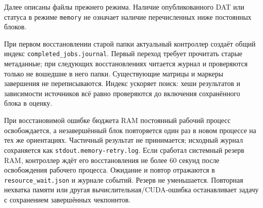 Далее описаны файлы прежнего режима. Наличие опубликованного DAT или
статуса в режиме \texttt{memory} не означает наличие перечисленных ниже
постоянных блоков.

При первом восстановлении старой папки актуальный контроллер создаёт
общий индекс \nolinkurl{completed_jobs.journal}. Первый переход требует
прочитать старые метаданные; при следующих восстановлениях читается
журнал и проверяются только не вошедшие в него папки. Существующие
матрицы и маркеры завершения не переписываются. Индекс ускоряет поиск:
хеши результатов и зависимости источников всё равно проверяются до
включения сохранённого блока в оценку.

При восстановимой ошибке бюджета RAM постоянный рабочий процесс
освобождается, а незавершённый блок повторяется один раз в новом
процессе на тех же ориентациях. Частичный результат не принимается;
исходный журнал сохраняется как \texttt{stdout.memory-retry.log}. Если
сработал системный резерв RAM, контроллер ждёт его восстановления не
более 60 секунд после освобождения рабочего процесса. Ожидание и повтор
отражаются в \nolinkurl{resource_wait.json} и журнале событий. Резерв не
уменьшается. Повторная нехватка памяти или другая
вычислительная/CUDA-ошибка останавливает задачу с сохранением
завершённых чекпоинтов.

